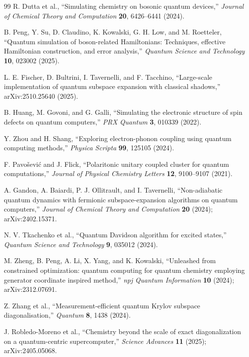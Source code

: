 \documentclass[
  reprint,
  amsmath,
  amssymb,
  aps,
  pra,
  nofootinbib,
  superscriptaddress,
  floatfix
]{revtex4-2}
\begin{document}
\begin{thebibliography}{99}
R. Dutta et al.,
``Simulating chemistry on bosonic quantum devices,''
\emph{Journal of Chemical Theory and Computation} \textbf{20}, 6426--6441 (2024).

B. Peng, Y. Su, D. Claudino, K. Kowalski, G. H. Low, and M. Roetteler,
``Quantum simulation of boson-related Hamiltonians: Techniques, effective Hamiltonian construction, and error analysis,''
\emph{Quantum Science and Technology} \textbf{10}, 023002 (2025).

L. E. Fischer, D. Bultrini, I. Tavernelli, and F. Tacchino,
``Large-scale implementation of quantum subspace expansion with classical shadows,''
arXiv:2510.25640 (2025).

B. Huang, M. Govoni, and G. Galli,
``Simulating the electronic structure of spin defects on quantum computers,''
\emph{PRX Quantum} \textbf{3}, 010339 (2022).

Y. Zhou and H. Shang,
``Exploring electron-phonon coupling using quantum computing methods,''
\emph{Physica Scripta} \textbf{99}, 125105 (2024).

F. Pavo\v{s}evi\'c and J. Flick,
``Polaritonic unitary coupled cluster for quantum computations,''
\emph{Journal of Physical Chemistry Letters} \textbf{12}, 9100--9107 (2021).

A. Gandon, A. Baiardi, P. J. Ollitrault, and I. Tavernelli,
``Non-adiabatic quantum dynamics with fermionic subspace-expansion algorithms on quantum computers,''
\emph{Journal of Chemical Theory and Computation} \textbf{20} (2024); arXiv:2402.15371.

N. V. Tkachenko et al.,
``Quantum Davidson algorithm for excited states,''
\emph{Quantum Science and Technology} \textbf{9}, 035012 (2024).

M. Zheng, B. Peng, A. Li, X. Yang, and K. Kowalski,
``Unleashed from constrained optimization: quantum computing for quantum chemistry employing generator coordinate inspired method,''
\emph{npj Quantum Information} \textbf{10} (2024); arXiv:2312.07691.

Z. Zhang et al.,
``Measurement-efficient quantum Krylov subspace diagonalisation,''
\emph{Quantum} \textbf{8}, 1438 (2024).

J. Robledo-Moreno et al.,
``Chemistry beyond the scale of exact diagonalization on a quantum-centric supercomputer,''
\emph{Science Advances} \textbf{11} (2025); arXiv:2405.05068.


\end{thebibliography}
\end{document}
